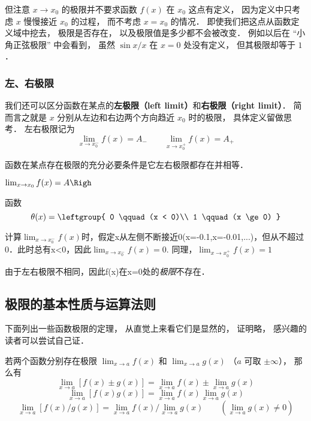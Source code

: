 但注意 $x\to x_0$ 的极限并不要求函数 $f(x)$ 在 $x_0$ 这点有定义， 因为定义中只考虑 $x$ 慢慢接近 $x_0$ 的过程， 而不考虑 $x = x_0$ 的情况． 即使我们把这点从函数定义域中挖去， 极限是否存在， 以及极限值是多少都不会被改变． 例如以后在 “小角正弦极限” 中会看到， 虽然 $\sin x/ x$ 在 $x = 0$ 处没有定义， 但其极限却等于 $1$．

\subsubsection{左、右极限}
我们还可以区分函数在某点的\textbf{左极限（left limit）}和\textbf{右极限（right limit）}． 简而言之就是 $x$ 分别从左边和右边两个方向趋近 $x_0$ 时的极限， 具体定义留做思考． 左右极限记为
\begin{equation}
\lim_{x\to x_0^-} f(x) = A_- \qquad \lim_{x\to x_0^+} f(x) = A_+
\end{equation}

\begin{theorem}{}
函数在某点存在极限的充分必要条件是它左右极限都存在并相等．

$\lim_{x\to x_0} f(x) = A \Righ$
\end{theorem}

\begin{example}{}
函数
\begin{equation}
\theta(x) = \leftgroup{
0 \qquad (x < 0)\\
1 \qquad (x \ge 0)
}\end{equation}

计算$\lim_{x\to x_0^-} f(x)$时，假定x从左侧不断接近0(x=-0.1,x=-0.01,...)，但从不超过0．此时总有x<0，因此$\lim_{x\to x_0^-} f(x) = 0$. 同理，$\lim_{x\to x_0^+} f(x) = 1$

由于左右极限不相同，因此f(x)在x=0处的\textsl{极限}不存在．
\end{example}






\subsection{极限的基本性质与运算法则}
下面列出一些函数极限的定理， 从直觉上来看它们是显然的， 证明略， 感兴趣的读者可以尝试自己证．
\begin{theorem}{}
若两个函数分别存在极限 $\lim_{x\to a} f(x)$ 和 $\lim_{x\to a} g(x)$ （$a$ 可取 $\pm \infty$）， 那么有
\begin{equation}
\lim_{x\to a} [f(x) \pm g(x)] = \lim_{x\to a}f(x) \pm  \lim_{x\to a} g(x)
\end{equation}
\begin{equation}
\lim_{x\to a} [f(x) g(x)] = \lim_{x\to a}f(x) \lim_{x\to a} g(x)
\end{equation}
\begin{equation}
\lim_{x\to a} [f(x)/g(x)] = \lim_{x\to a}f(x)/\lim_{x\to a} g(x) \qquad (\lim_{x\to a} g(x) \ne 0)
\end{equation}
\end{theorem}
